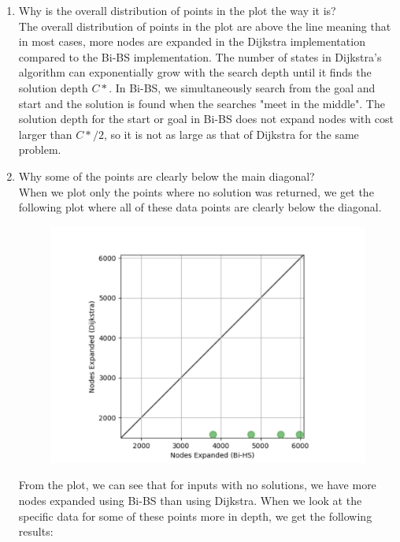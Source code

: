 \documentclass[8pt, letterpaper, titlepage]{article}
\begin{document}
\begin{enumerate}
  \item Why is the overall distribution of points in the plot the way it is?\\
    The overall distribution of points in the plot are above the line meaning that in most cases, more nodes are expanded in the Dijkstra implementation compared to the Bi-BS implementation. The number of states in Dijkstra's algorithm can exponentially grow with the search depth until it finds the solution depth $C*$. In Bi-BS, we simultaneously search from the goal and start and the solution is found when the searches "meet in the middle". The solution depth for the start or goal in Bi-BS does not expand nodes with cost larger than $C*/2$, so it is not as large as that of Dijkstra for the same problem.
  \item Why some of the points are clearly below the main diagonal?\\
    When we plot only the points where no solution was returned, we get the following plot where all of these data points are clearly below the diagonal. 
  \begin{figure}[H]
    \begin{center}    
      \includegraphics[width=\linewidth*3/6]{image2.png}
    \end{center}
  \end{figure}
  From the plot, we can see that for inputs with no solutions, we have more nodes expanded using Bi-BS than using Dijkstra. When we look at the specific data for some of these points more in depth, we get the following results:


\end{enumerate}
\end{document}
